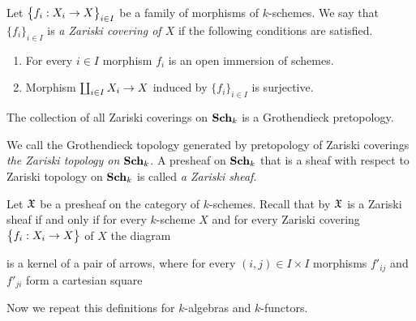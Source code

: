 \begin{definition}
Let $\big\{f_i:X_i\rightarrow X\big\}_{i\in I}$ be a family of morphisms of $k$-schemes. We say that $\{f_i\}_{i\in I}$ is \textit{a Zariski covering of $X$} if the following conditions are satisfied.
\begin{enumerate}[label=\textbf{(\arabic*)}, leftmargin=1.5em]
\item For every $i\in I$ morphism $f_i$ is an open immersion of schemes.
\item Morphism $\coprod_{i\in I}X_i\rightarrow X$ induced by $\big\{f_i\big\}_{i\in I}$ is surjective.
\end{enumerate}
\end{definition}
\noindent
The collection of all Zariski coverings on $\mathbf{Sch}_k$ is a Grothendieck pretopology.

\begin{definition}
We call the Grothendieck topology generated by pretopology of Zariski coverings \textit{the Zariski topology on $\mathbf{Sch}_k$}. A presheaf on $\mathbf{Sch}_k$ that is a sheaf with respect to Zariski topology on $\mathbf{Sch}_k$ is called \textit{a Zariski sheaf}.
\end{definition}
\noindent
Let ${\mathfrak X}$ be a presheaf on the category of $k$-schemes. Recall that by {\cite[Theorem 3.5]{Sheaves}} ${\mathfrak X}$ is a Zariski sheaf if and only if for every $k$-scheme $X$ and for every Zariski covering $\big\{f_i:X_i\rightarrow X\big\}$ of $X$ the diagram
\begin{center}
\end{center}
is a kernel of a pair of arrows, where for every $(i,j)\in I\times I$ morphisms $f'_{ij}$ and $f'_{ji}$ form a cartesian square
\begin{center}
\end{center}
\noindent
Now we repeat this definitions for $k$-algebras and $k$-functors.

